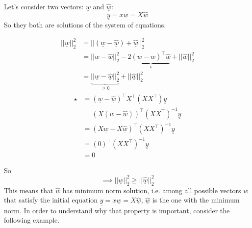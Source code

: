 Let's consider two vectors: $\underline{w}$ and $\underline{\hat{w}}$:
\[
    \underline{y} = x\underline{w} = X\underline{\hat{w}}     
\]
So they both are solutions of the system of equations.
\begin{multicols}{2}
\[
    \begin{split}
        ||\underline{w}||_2^2 &= ||(\underline{w} - \hat{\underline{w}}) + \hat{\underline{w}}||_2^2\\
        &= ||\underline{w} - \hat{\underline{w}}||^2_2 - 2\underbrace{(\underline{w}-\hat{\underline{w}})^\intercal \hat{\underline{w}}}_{\star} + ||\hat{\underline{w}}||^2_2    \\
        &= \underbrace{||\underline{w} - \hat{\underline{w}}||_2^2}_{\geq 0} + ||\hat{\underline{w}}||^2_2 
    \end{split}
\]    
\[
    \begin{split}
        \star &= (\underline{w} - \hat{\underline{w}})^\intercal X^\intercal(XX^\intercal) \underline{y}\\
        &= (X(\underline{w} - \hat{\underline{w}}))^\intercal (XX^\intercal)^{-1} \underline{y}\\
        &= (X\underline{w} - X\hat{\underline{w}})^\intercal (XX^\intercal)^{-1} \underline{y}\\
        &= (0)^\intercal (XX^\intercal)^{-1} \underline{y}\\
        &= 0
    \end{split}    
\]
\end{multicols}
So
\[
    \implies ||\underline{w}||_2^2 \geq ||\hat{\underline{w}}||^2_2     
\]
This means that $\underline{\hat{w}}$ has minimum norm solution, i.e. among all possible vectors $w$ that satisfy the initial equation $ \underline{y} = x\underline{w} = X\underline{\hat{w}}$, $\underline{\hat{w}}$ is the one with the minimum norm. In order to understand why that property is important, consider the following example.\\

